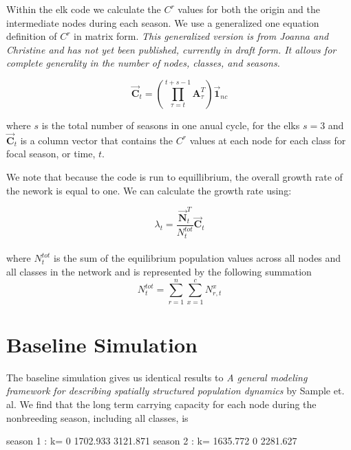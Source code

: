 \documentclass[10pt]{article}
\begin{document}
Within the elk code we calculate the $C^r$ values for both the origin and the intermediate nodes during each season. We use a generalized one equation definition of $C^r$ in matrix form. {\it{This generalized version is from Joanna and Christine and has not yet been published, currently in draft form. It allows for complete generality in the number of nodes, classes, and seasons.}}

\begin{equation}
\vec{\mathbf{C}}_t=\left(\prod_{\tau=t}^{t+s-1}\mathbf{A}_\tau^T\right)\vec{\mathbf{1}}_{nc}
\end{equation}

where $s$ is the total number of seasons in one anual cycle, for the elks $s=3$ and $\vec{\mathbf{C}}_t$ is a column vector that contains the $C^r$ values at each node for each class for focal season, or time, $t$. 

We note that because the code is run to equillibrium, the overall growth rate of the nework is equal to one. We can calculate the growth rate using:

\begin{equation}
\lambda_t= \frac{\vec{\mathbf{N}}_t^T}{N_t^{tot}}\vec{\mathbf{C}}_t
\label{lambda}
\end{equation}\\
where $N_t^{tot}$ is the sum of the equilibrium population values across all nodes and all classes in the network and is represented by the following summation
\begin{equation}
N_t^{tot}=\sum_{r=1}^n\sum_{x=1}^{c}N^x_{r,t}
\end{equation}

\section{Baseline Simulation}
% 
The baseline simulation gives us identical results to {\it{A general modeling framework for describing spatially
structured population dynamics}} by Sample et. al. We find that the long term carrying capacity for each node during the nonbreeding season, including all classes, is

\begin{Schunk}
\begin{Soutput}
season 1 : k= 0 1702.933 3121.871
season 2 : k= 1635.772 0 2281.627
\end{Soutput}
\end{Schunk}
\end{document}
